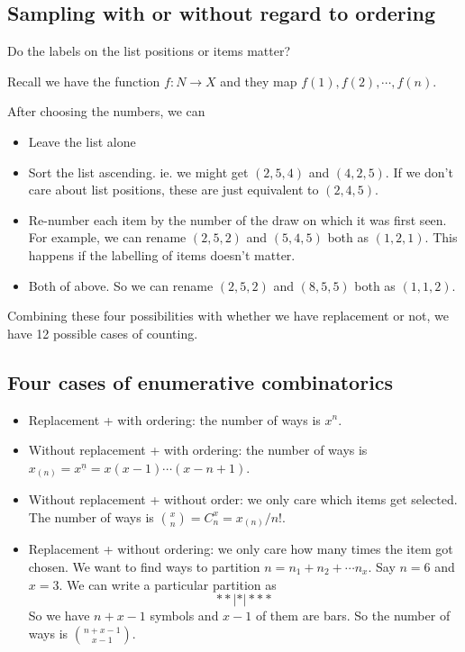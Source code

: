 \documentclass[a4paper]{article}
\begin{document}
\subsection{Sampling with or without regard to ordering}
Do the labels on the list positions or items matter?

Recall we have the function $f: N\to X$ and they map $f(1), f(2), \cdots, f(n)$.

After choosing the numbers, we can
\begin{itemize}
  \item Leave the list alone
  \item Sort the list ascending. ie. we might get $(2, 5, 4)$ and $(4, 2, 5)$. If we don't care about list positions, these are just equivalent to $(2, 4, 5)$.
  \item Re-number each item by the number of the draw on which it was first seen. For example, we can rename $(2, 5, 2)$ and $(5, 4, 5)$ both as $(1, 2, 1)$. This happens if the labelling of items doesn't matter.
  \item Both of above. So we can rename $(2, 5, 2)$ and $(8, 5, 5)$ both as $(1, 1, 2)$.
\end{itemize}

Combining these four possibilities with whether we have replacement or not, we have 12 possible cases of counting.

\subsection{Four cases of enumerative combinatorics}
\begin{itemize}
  \item Replacement + with ordering: the number of ways is $x^n$.
  \item Without replacement + with ordering: the number of ways is $x_{(n)} = x^{\underline{n}} = x(x - 1)\cdots (x - n + 1)$.
  \item Without replacement + without order: we only care which items get selected. The number of ways is $\binom{x}{n} = C^x_n = x_{(n)}/n!$.
  \item Replacement + without ordering: we only care how many times the item got chosen. We want to find ways to partition $n = n_1 + n_2 + \cdots n_x$. Say $n = 6$ and $x = 3$. We can write a particular partition as
    \[
      **|*|***
    \]
  So we have $n + x - 1$ symbols and $x - 1$ of them are bars. So the number of ways is $\binom{n + x - 1}{x - 1}$.
\end{itemize}
\end{document}
